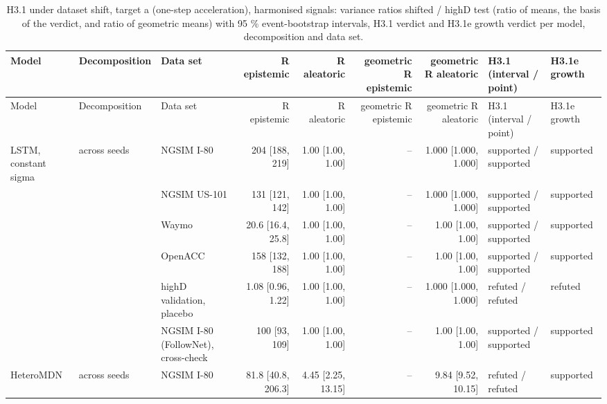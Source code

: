 \begingroup
\footnotesize
\begin{longtable}{lllrrrrll}
\caption{H3.1 under dataset shift, target a (one-step acceleration), harmonised signals: variance ratios shifted / highD test (ratio of means, the basis of the verdict, and ratio of geometric means) with 95 \% event-bootstrap intervals, H3.1 verdict and H3.1e growth verdict per model, decomposition and data set.}\label{tab:t2-h31--harmonised--a} \\
\toprule
Model & Decomposition & Data set & R epistemic & R aleatoric & geometric R epistemic & geometric R aleatoric & H3.1 (interval / point) & H3.1e growth \\
\midrule
\endfirsthead
\toprule
Model & Decomposition & Data set & R epistemic & R aleatoric & geometric R epistemic & geometric R aleatoric & H3.1 (interval / point) & H3.1e growth \\
\midrule
\endhead
\bottomrule
\endlastfoot
LSTM, constant sigma & across seeds & NGSIM I-80 & 204 [188, 219] & 1.00 [1.00, 1.00] & -- & 1.000 [1.000, 1.000] & supported / supported & supported \\
 &  & NGSIM US-101 & 131 [121, 142] & 1.00 [1.00, 1.00] & -- & 1.000 [1.000, 1.000] & supported / supported & supported \\
 &  & Waymo & 20.6 [16.4, 25.8] & 1.00 [1.00, 1.00] & -- & 1.00 [1.00, 1.00] & supported / supported & supported \\
 &  & OpenACC & 158 [132, 188] & 1.00 [1.00, 1.00] & -- & 1.00 [1.00, 1.00] & supported / supported & supported \\
 &  & highD validation, placebo & 1.08 [0.96, 1.22] & 1.00 [1.00, 1.00] & -- & 1.000 [1.000, 1.000] & refuted / refuted & refuted \\
 &  & NGSIM I-80 (FollowNet), cross-check & 100 [93, 109] & 1.00 [1.00, 1.00] & -- & 1.00 [1.00, 1.00] & supported / supported & supported \\
\midrule
HeteroMDN & across seeds & NGSIM I-80 & 81.8 [40.8, 206.3] & 4.45 [2.25, 13.15] & -- & 9.84 [9.52, 10.15] & refuted / refuted & supported \\

\end{longtable}
